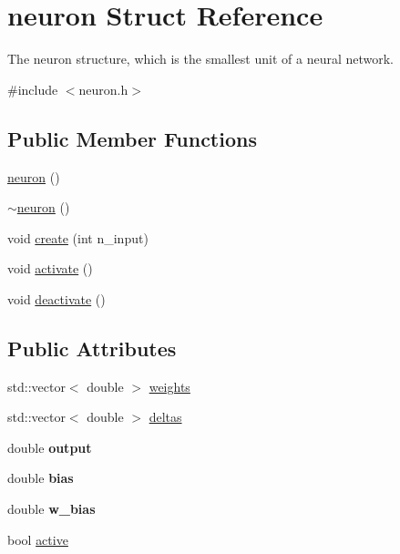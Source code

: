 \hypertarget{structneuron}{\section{neuron Struct Reference}
\label{structneuron}
}


The neuron structure, which is the smallest unit of a neural network.  




{\ttfamily \#include $<$neuron.\-h$>$}

\subsection*{Public Member Functions}
\begin{DoxyCompactItemize}
\item 
\hyperlink{structneuron_a4d11d8f1c09393022c099f0ec07d1fbf}{neuron} ()
\item 
\hyperlink{structneuron_a69a9b529ba8d2b4ad4c996bf08a8bd2f}{$\sim$neuron} ()
\item 
void \hyperlink{structneuron_abbe656fe98d44f42741b9b3412c05187}{create} (int n\-\_\-input)
\item 
void \hyperlink{structneuron_a6751788971a339ccc522333f740ffd41}{activate} ()
\item 
void \hyperlink{structneuron_adbea299710f3a6402e83433b3c0cabf9}{deactivate} ()
\end{DoxyCompactItemize}
\subsection*{Public Attributes}
\begin{DoxyCompactItemize}
\item 
std\-::vector$<$ double $>$ \hyperlink{structneuron_a46dd6f29c430390f623f708e12fdf333}{weights}
\item 
std\-::vector$<$ double $>$ \hyperlink{structneuron_adbb698db478b03d1df7da41d977a8690}{deltas}
\item 
\hypertarget{structneuron_ae47a1f9995c0649c2d5811692c1d294f}{double {\bfseries output}}\label{structneuron_ae47a1f9995c0649c2d5811692c1d294f}

\item 
\hypertarget{structneuron_a9ab850dc68643bc01d84c6bbef9640a9}{double {\bfseries bias}}\label{structneuron_a9ab850dc68643bc01d84c6bbef9640a9}

\item 
\hypertarget{structneuron_a02ae7cb21e0edaf78e96b687ae10c2b6}{double {\bfseries w\-\_\-bias}}\label{structneuron_a02ae7cb21e0edaf78e96b687ae10c2b6}

\item 
bool \hyperlink{structneuron_a23ae47a4501a58d5f9ac6b5d37622e9a}{active}
\end{DoxyCompactItemize}


